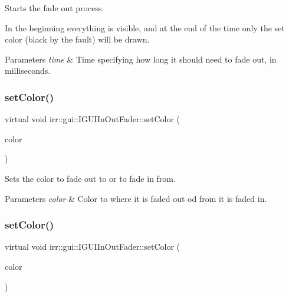 Starts the fade out process. 

In the beginning everything is visible, and at the end of the time only the set color (black by the fault) will be drawn. 
\begin{DoxyParams}{Parameters}
{\em time} & Time specifying how long it should need to fade out, in milliseconds. \\
\hline
\end{DoxyParams}
\mbox{\label{classirr_1_1gui_1_1IGUIInOutFader_aba1cdb4928662a2340aa6600850e03d1}} 
\subsubsection{\texorpdfstring{set\+Color()}{setColor()}\hspace{0.1cm}{\footnotesize\ttfamily [1/2]}}
{\footnotesize\ttfamily virtual void irr\+::gui\+::\+I\+G\+U\+I\+In\+Out\+Fader\+::set\+Color (\begin{DoxyParamCaption}\item[{\hyperlink{classirr_1_1video_1_1SColor}{video\+::\+S\+Color}}]{color }\end{DoxyParamCaption})\hspace{0.3cm}{\ttfamily [pure virtual]}}



Sets the color to fade out to or to fade in from. 


\begin{DoxyParams}{Parameters}
{\em color} & Color to where it is faded out od from it is faded in. \\
\hline
\end{DoxyParams}
\mbox{\label{classirr_1_1gui_1_1IGUIInOutFader_aba1cdb4928662a2340aa6600850e03d1}} 
\subsubsection{\texorpdfstring{set\+Color()}{setColor()}\hspace{0.1cm}{\footnotesize\ttfamily [2/2]}}
{\footnotesize\ttfamily virtual void irr\+::gui\+::\+I\+G\+U\+I\+In\+Out\+Fader\+::set\+Color (\begin{DoxyParamCaption}\item[{\hyperlink{classirr_1_1video_1_1SColor}{video\+::\+S\+Color}}]{color }\end{DoxyParamCaption})\hspace{0.3cm}{\ttfamily [pure virtual]}}



